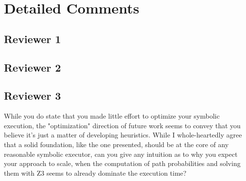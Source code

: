 \section{Detailed Comments}

\subsection{Reviewer 1}

\subsection{Reviewer 2}

\subsection{Reviewer 3}

While you do state that you made little effort to optimize your symbolic
execution, the "optimization" direction of future work seems to convey that 
you believe it's just a matter of developing heuristics. While I whole-heartedly agree 
that a solid foundation, like the one presented, should be at the core of 
any reasonable symbolic executor, can you give any intuition as to why you 
expect your approach to scale, when the computation of path probabilities 
and solving them with Z3 seems to already dominate the execution time?
